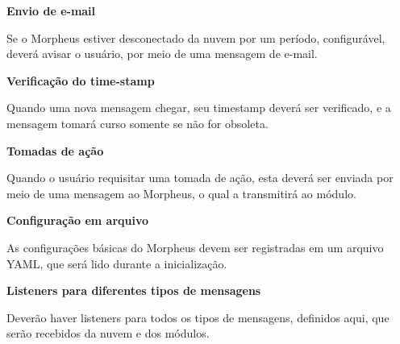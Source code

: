 \begin{description}
\item \textbf{Envio de e-mail}

Se o Morpheus estiver desconectado da nuvem por um período, configurável, deverá avisar o usuário, por meio de uma mensagem de e-mail.

\item \textbf{Verificação do time-stamp}

Quando uma nova mensagem chegar, seu timestamp deverá ser verificado, e a mensagem tomará curso somente se não for obsoleta.

\item \textbf{Tomadas de ação}

Quando o usuário requisitar uma tomada de ação, esta deverá ser enviada por meio de uma mensagem ao Morpheus, o qual a transmitirá ao módulo.

\item \textbf{Configuração em arquivo}

As configurações básicas do Morpheus devem ser registradas em um arquivo YAML, que será lido durante a inicialização.

\item \textbf{Listeners para diferentes tipos de mensagens}

Deverão haver listeners para todos os tipos de mensagens, definidos aqui, que serão recebidos da nuvem e dos módulos.

\end{description}

